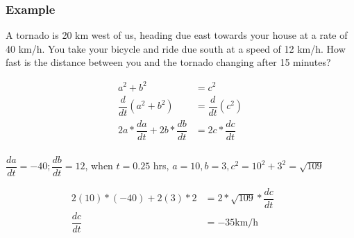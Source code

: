 \documentclass[t]{beamer}
\theoremstyle{plain}
\theoremstyle{definition}
\newcounter{heading}
\begin{document}
\begin{frame}

\frametitle{Example}

\footnotesize

A tornado is 20 km west of us, heading due east towards your house at a rate of 40 km/h.  You take your bicycle and ride due south at a speed of 12 km/h.  How fast is the distance between you and the tornado changing after 15 minutes?

\vspace{-1em}

\begin{align*}
    a^2 + b^2 &= c^2 \\
    \dfrac{d}{dt}(a^2 + b^2) &= \dfrac{d}{dt} (c^2) \\
   2a* \dfrac{da}{dt} + 2b* \dfrac{db}{dt}  &= 2c* \dfrac{dc}{dt} \\
\end{align*}

\vspace{-1em}

$\dfrac{da}{dt} = -40; \dfrac{db}{dt} =12$,  when $t=0.25$ hrs, $a=10, b=3, c^2 = 10^2 + 3^2 = \sqrt{109}$ 

\begin{align*}
   2(10)*(-40) + 2(3)*2 &= 2 * \sqrt{109} * \dfrac{dc}{dt}  &&\\
   \dfrac{dc}{dt} &= -35 \text{km/h} 
\end{align*}	

\end{frame}
\end{document}
